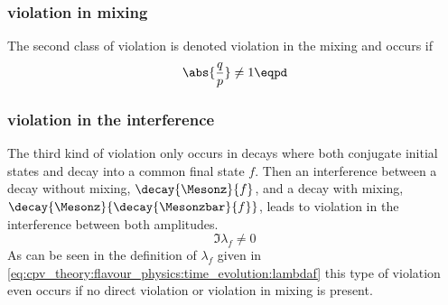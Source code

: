 \subsubsection[\CP violation in mixing]{\CPbfsf violation in mixing}
\label{sec:cpv_theory:flavour_physics:cpv_classification:mixing}

The second class of \CP violation is denoted \CP violation in the mixing and
occurs if
%
\begin{equation}
  \abs{\frac{q}{p}} \neq 1 \eqpd
\end{equation}
%

\subsubsection[\CP violation in the interference]{\CPbfsf violation in the interference}
\label{sec:cpv_theory:flavour_physics:cpv_classification:interference}

The third kind of \CP violation only occurs in decays where both \CP conjugate
initial states \Mesonz and \Mesonzbar decay into a common final state $f$. Then
an interference between a decay without mixing, $\decay{\Mesonz}{f}$, and a
decay with mixing, $\decay{\Mesonz}{\decay{\Mesonzbar}{f}}$, leads to \CP
violation in the interference between both amplitudes.
%
\begin{equation}
  \Im \lambda_f \neq 0   
\end{equation}
%
As can be seen in the definition of $\lambda_f$ given in
\cref{eq:cpv_theory:flavour_physics:time_evolution:lambdaf} this type of \CP
violation even occurs if no direct \CP violation or \CP violation in mixing is
present.
